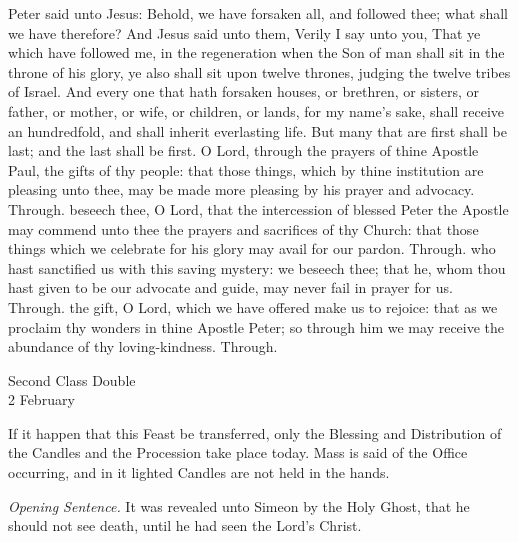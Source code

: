  Peter said unto Jesus: Behold, we have forsaken all, and followed thee; what shall we have therefore? And Jesus said unto them, Verily I say unto you, That ye which have followed me, in the regeneration when the Son of man shall sit in the throne of his glory, ye also shall sit upon twelve thrones, judging the twelve tribes of Israel. And every one that hath forsaken houses, or brethren, or sisters, or father, or mother, or wife, or children, or lands, for my name's sake, shall receive an hundredfold, and shall inherit everlasting life. But many that are first shall be last; and the last shall be first.
\secret
{} O Lord, through the prayers of thine Apostle Paul, the gifts of thy people: that those things, which by thine institution are pleasing unto thee, may be made more pleasing by his prayer and advocacy. Through.
 beseech thee, O Lord, that the intercession of blessed Peter the Apostle may commend unto thee the prayers and sacrifices of thy Church: that those things which we celebrate for his glory may avail for our pardon. Through.
\postcommunion
{} who hast sanctified us with this saving mystery: we beseech thee; that he, whom thou hast given to be our advocate and guide, may never fail in prayer for us. Through.
 the gift, O Lord, which we have offered make us to rejoice: that as we proclaim thy wonders in thine Apostle Peter; so through him we may receive the abundance of thy loving-kindness. Through.

\begin{inhead}
    {Second Class Double\\
2 February}
\end{inhead}
\begin{rubric}
    If it happen that this Feast be transferred, only the Blessing and Distribution of the Candles and the Procession take place today. Mass is said of the Office occurring, and in it lighted Candles are not held in the hands.
\end{rubric}
\par\noindent
\textit{Opening Sentence.} It was revealed unto Simeon by the Holy Ghost, that he should not see death, until he had seen the Lord's Christ.

